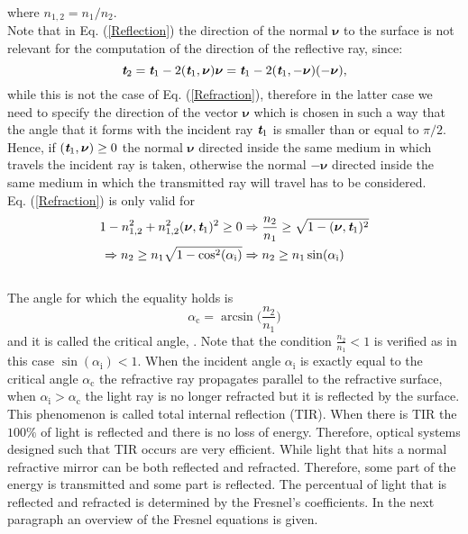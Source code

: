 where $n_{1,2}=n_1/n_2$. \\
 \indent Note that in Eq. (\ref{Reflection}) the direction of the normal $\boldsymbol{\nu}$ to the surface is not relevant for the computation of the direction of the reflective ray, since:
\begin{equation}
\textit{\textbf{t}}_2 = \textit{\textbf{t}}_1-2(\textit{\textbf{t}}_1,\boldsymbol{\nu})\boldsymbol{\nu}= \textit{\textbf{t}}_1-2(\textit{\textbf{t}}_1,-\boldsymbol{\nu})(-\boldsymbol{\nu}) ,
\end{equation}
while this is not the case of Eq. (\ref{Refraction}), therefore in the latter case we need to specify the direction of the vector $\boldsymbol{\nu}$ which is chosen in such a way that the angle that it forms with the incident ray $\textit{\textbf{t}}_1$ is smaller than or equal to $\pi/2$. Hence, if $(\textit{\textbf{t}}_1, \boldsymbol{\nu})\geq0$ the normal $\boldsymbol{\nu}$ directed inside the same medium in which travels the incident ray is taken, otherwise the normal $-\boldsymbol{\nu}$ directed inside the same medium in which the transmitted ray will travel has to be considered. \\ \indent
Eq. (\ref{Refraction}) is only valid for 
\begin{equation}\label{tir}\begin{split}
1-n_{1,2}^2+n_{1,2}^2(\boldsymbol{\nu},\textit{\textbf{t}}_1)^2\geq 0 & \Rightarrow \frac{n_2}{n_1}\geq \sqrt{1-(\boldsymbol{\nu},\textit{\textbf{t}}_1)^2}\\
\Rightarrow n_2\geq n_1\sqrt{1-\cos^2(\alpha_\textrm{i})} & \Rightarrow  n_2\geq n_1 \sin(\alpha_\textrm{i})
\end{split}
\end{equation}
\\ \indent
 The angle for which the equality holds is
\begin{equation}\label{critical}
\alpha_{\textrm{c}} = \arcsin\Big(\frac{n_2}{n_1}\Big)
\end{equation} and it is called the critical angle, \cite{chaves2015introduction}.
Note that the condition $\frac{n_2}{n_1}<1$ is verified as in this case $\sin(\alpha_\textrm{i})<1$.
When the incident angle $\alpha_{\textrm{i}}$ is exactly equal to the critical angle $\alpha_{\textrm{c}}$ the refractive ray propagates parallel to the refractive surface, 
when $\alpha_{\textrm{i}}>\alpha_{\textrm{c}}$ the light ray is no longer refracted but it is reflected by the surface. This phenomenon is called total internal reflection (TIR). When there is TIR the $100\%$ of light is reflected and there is no loss of energy. Therefore, optical systems designed such that TIR occurs are very efficient. While light that hits a normal refractive mirror can be both reflected and refracted. Therefore, some part of the energy is transmitted and some part is reflected. The percentual of light that is reflected and refracted is determined by the Fresnel's coefficients.
In the next paragraph an overview of the Fresnel equations is given.

